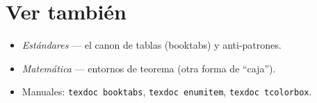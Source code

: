 \documentclass[11pt,a4paper]{article}
\begin{document}
\section*{Ver también}
\begin{itemize}[noitemsep,leftmargin=*]
  \item \emph{Estándares} — el canon de tablas (booktabs) y anti-patrones.
  \item \emph{Matemática} — entornos de teorema (otra forma de \enquote{caja}).
  \item Manuales: \texttt{texdoc booktabs}, \texttt{texdoc enumitem},
        \texttt{texdoc tcolorbox}.
\end{itemize}
\end{document}
